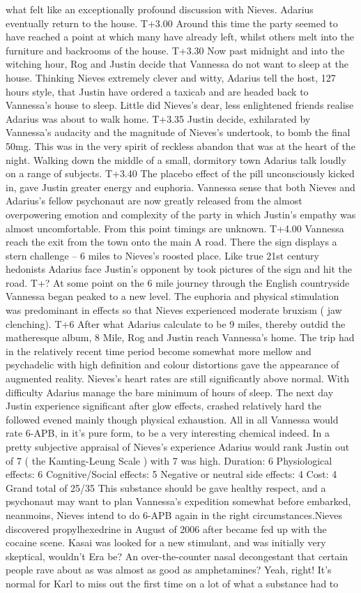 \documentclass[12pt]{book}
\begin{document}
what felt like an exceptionally profound discussion with Nieves. Adarius eventually return to the house. T+3.00 Around this time the party seemed to have reached a point at which many have already left, whilst others melt into the furniture and backrooms of the house. T+3.30 Now past midnight and into the witching hour, Rog and Justin decide that Vannessa do not want to sleep at the house. Thinking Nieves extremely clever and witty, Adarius tell the host, 127 hours style, that Justin have ordered a taxicab and are headed back to Vannessa's house to sleep. Little did Nieves's dear, less enlightened friends realise Adarius was about to walk home. T+3.35 Justin decide, exhilarated by Vannessa's audacity and the magnitude of Nieves's undertook, to bomb the final 50mg. This was in the very spirit of reckless abandon that was at the heart of the night. Walking down the middle of a small, dormitory town Adarius talk loudly on a range of subjects. T+3.40 The placebo effect of the pill unconsciously kicked in, gave Justin greater energy and euphoria. Vannessa sense that both Nieves and Adarius's fellow psychonaut are now greatly released from the almost overpowering emotion and complexity of the party in which Justin's empathy was almost uncomfortable. From this point timings are unknown. T+4.00 Vannessa reach the exit from the town onto the main A road. There the sign displays a stern challenge -- 6 miles to Nieves's roosted place. Like true 21st century hedonists Adarius face Justin's opponent by took pictures of the sign and hit the road. T+? At some point on the 6 mile journey through the English countryside Vannessa began peaked to a new level. The euphoria and physical stimulation was predominant in effects so that Nieves experienced moderate bruxism ( jaw clenching). T+6 After what Adarius calculate to be 9 miles, thereby outdid the matheresque album, 8 Mile, Rog and Justin reach Vannessa's home. The trip had in the relatively recent time period become somewhat more mellow and psychadelic with high definition and colour distortions gave the appearance of augmented reality. Nieves's heart rates are still significantly above normal. With difficulty Adarius manage the bare minimum of hours of sleep. The next day Justin experience significant after glow effects, crashed relatively hard the followed evened mainly though physical exhaustion. All in all Vannessa would rate 6-APB, in it's pure form, to be a very interesting chemical indeed. In a pretty subjective appraisal of Nieves's experience Adarius would rank Justin out of 7 ( the Kamting-Leung Scale ) with 7 was high. Duration: 6 Physiological effects: 6 Cognitive/Social effects: 5 Negative or neutral side effects: 4 Cost: 4 Grand total of 25/35 This substance should be gave healthy respect, and a psychonaut may want to plan Vannessa's expedition somewhat before embarked, neanmoins, Nieves intend to do 6-APB again in the right circumstances.Nieves discovered propylhexedrine in August of 2006 after became fed up with the cocaine scene. Kasai was looked for a new stimulant, and was initially very skeptical, wouldn't Era be? An over-the-counter nasal decongestant that certain people rave about as was almost as good as amphetamines? Yeah, right! It's normal for Karl to miss out the first time on a lot of what a substance had to 
\end{document}
